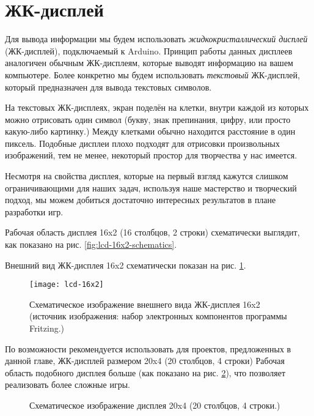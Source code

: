 \documentclass[../sparc.tex]{subfiles}
\begin{document}
\section{ЖК-дисплей}

Для вывода информации мы будем использовать \emph{жидкокристаллический дисплей}
(ЖК-дисплей), подключаемый к Arduino.  Принцип работы данных дисплеев аналогичен
обычным ЖК-дисплеям, которые выводят информацию на вашем компьютере.  Более
конкретно мы будем использовать \emph{текстовый} ЖК-дисплей, который
предназначен для вывода текстовых символов.

На текстовых ЖК-дисплеях, экран поделён на клетки, внутри каждой из которых
можно отрисовать один символ (букву, знак препинания, цифру, или просто
какую-либо картинку.)  Между клетками обычно находится расстояние в один
пиксель.  Подобные дисплеи плохо подходят для отрисовки произвольных
изображений, тем не менее, некоторый простор для творчества у нас имеется.

Несмотря на свойства дисплея, которые на первый взгляд кажутся слишком
ограничивающими для наших задач, используя наше мастерство и творческий подход,
мы можем добиться достаточно интересных результатов в плане разработки игр.

Рабочая область дисплея 16x2 (16 столбцов, 2 строки) схематически выглядит, как
показано на рис. \ref{fig:lcd-16x2-schematics}.


Внешний вид ЖК-дисплея 16x2 схематически показан на рис. \ref{fig:lcd-16x2}.

\begin{figure}[h]
  \centering
  \texttt{[image: lcd-16x2]}
  \caption{Схематическое изображение внешнего вида ЖК-дисплея 16x2 (источник
    изображения: набор электронных компонентов программы Fritzing.)}
  \label{fig:lcd-16x2}
\end{figure}

По возможности рекомендуется использовать для проектов, предложенных в данной
главе, ЖК-дисплей размером 20x4 (20 столбцов, 4 строки) Рабочая область
подобного дисплея больше (как показано на рис. \ref{fig:lcd-20x4-schematics}),
что позволяет реализовать более сложные игры.

\begin{figure}[ht]
  \centering
  \caption{Схематическое изображение дисплея 20x4 (20 столбцов, 4 строки.)}
  \label{fig:lcd-20x4-schematics}
\end{figure}
\end{document}
